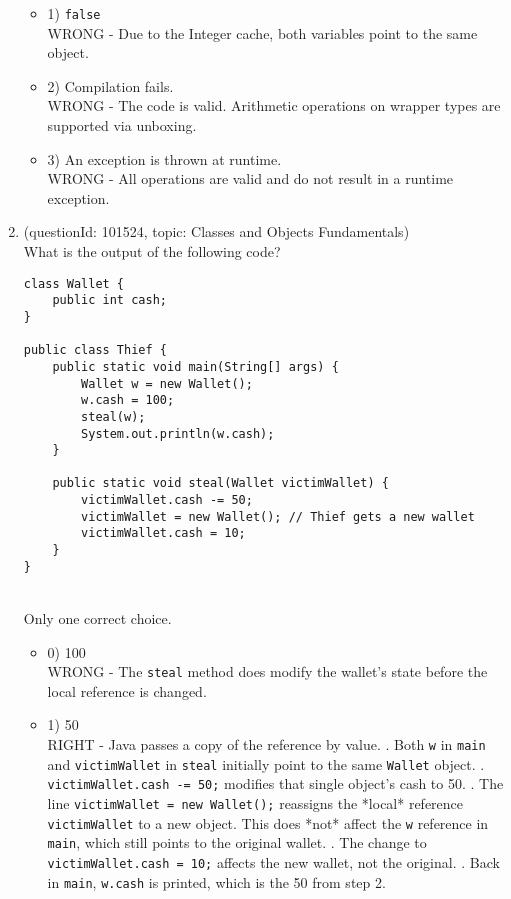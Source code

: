 \documentclass[12pt]{article}
\begin{document}
\begin{enumerate}[label=(\arabic*)]
\begin{itemize}
\item 1) \verb|false|
 \\ 
WRONG - Due to the Integer cache, both variables point to the same object.

\item 2) Compilation fails.
 \\ 
WRONG - The code is valid. Arithmetic operations on wrapper types are supported via unboxing.

\item 3) An exception is thrown at runtime.
 \\ 
WRONG - All operations are valid and do not result in a runtime exception.

\end{itemize}
\item (questionId: 101524, topic: Classes and Objects Fundamentals) \\ 
What is the output of the following code?\n\begin{verbatim}
class Wallet {
    public int cash;
}

public class Thief {
    public static void main(String[] args) {
        Wallet w = new Wallet();
        w.cash = 100;
        steal(w);
        System.out.println(w.cash);
    }

    public static void steal(Wallet victimWallet) {
        victimWallet.cash -= 50;
        victimWallet = new Wallet(); // Thief gets a new wallet
        victimWallet.cash = 10;
    }
}
\end{verbatim}
\\ \noindent Only one correct choice. 
\begin{itemize}
\item 0) 100
 \\ 
WRONG - The \verb|steal| method does modify the wallet's state before the local reference is changed.

\item 1) 50
 \\ 
RIGHT - Java passes a copy of the reference by value. . Both \verb|w| in \verb|main| and \verb|victimWallet| in \verb|steal| initially point to the same \verb|Wallet| object. . \verb|victimWallet.cash -= 50;| modifies that single object's cash to 50. . The line \verb|victimWallet = new Wallet();| reassigns the *local* reference \verb|victimWallet| to a new object. This does *not* affect the \verb|w| reference in \verb|main|, which still points to the original wallet. . The change to \verb|victimWallet.cash = 10;| affects the new wallet, not the original. . Back in \verb|main|, \verb|w.cash| is printed, which is the 50 from step 2.


\end{itemize}
\end{enumerate}
\end{document}
